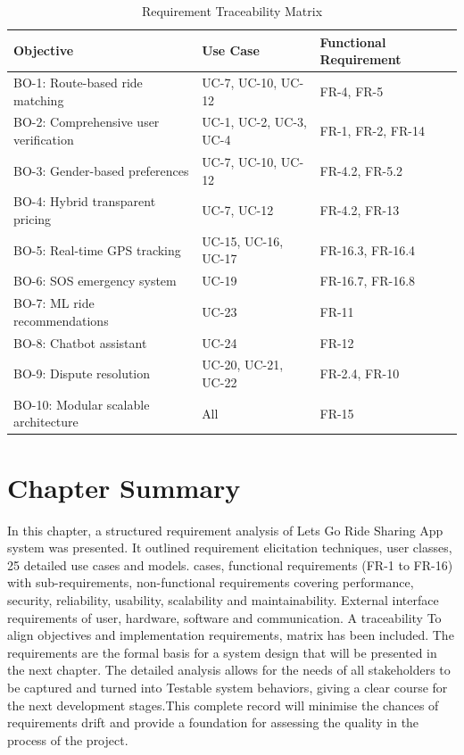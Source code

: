 \begin{longtable}{|p{3cm}|p{3cm}|p{8cm}|}
\caption{Requirement Traceability Matrix}
\label{tab:rtm} \\
\hline
\rowcolor{lightgray!30}
\textbf{Objective} & \textbf{Use Case} & \textbf{Functional Requirement} \\
\hline
BO-1: Route-based ride matching & UC-7, UC-10, UC-12 & FR-4, FR-5 \\
\hline
BO-2: Comprehensive user verification & UC-1, UC-2, UC-3, UC-4 & FR-1, FR-2, FR-14 \\
\hline
BO-3: Gender-based preferences & UC-7, UC-10, UC-12 & FR-4.2, FR-5.2 \\
\hline
BO-4: Hybrid transparent pricing & UC-7, UC-12 & FR-4.2, FR-13 \\
\hline
BO-5: Real-time GPS tracking & UC-15, UC-16, UC-17 & FR-16.3, FR-16.4 \\
\hline
BO-6: SOS emergency system & UC-19 & FR-16.7, FR-16.8 \\
\hline
BO-7: ML ride recommendations & UC-23 & FR-11 \\
\hline
BO-8: Chatbot assistant & UC-24 & FR-12 \\
\hline
BO-9: Dispute resolution & UC-20, UC-21, UC-22 & FR-2.4, FR-10 \\
\hline
BO-10: Modular scalable architecture & All & FR-15 \\
\hline
\end{longtable}

\section*{Chapter Summary}

In this chapter, a structured requirement analysis of Lets Go Ride Sharing App system was presented. It outlined requirement elicitation techniques, user classes, 25 detailed use cases and models. cases, functional requirements (FR-1 to FR-16) with sub-requirements, non-functional requirements covering performance, security, reliability, usability, scalability and maintainability. External interface requirements of user, hardware, software and communication. A traceability To align objectives and implementation requirements, matrix has been included. The requirements are the formal basis for a system design that will be presented in the next chapter. The detailed analysis allows for the needs of all stakeholders to be captured and turned into Testable system behaviors, giving a clear course for the next development stages.This complete record will minimise the chances of requirements drift and provide a foundation for assessing the quality in the process of the project.


